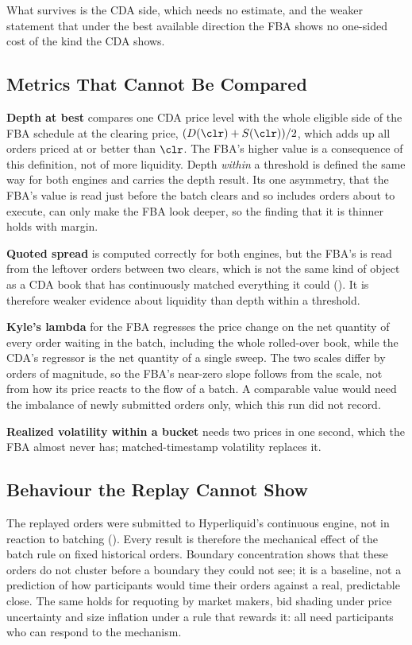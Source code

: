What survives is the CDA side, which needs no estimate, and the weaker
statement that under the best available direction the FBA shows no
one-sided cost of the kind the CDA shows.

\subsection{Metrics That Cannot Be Compared}
\label{sec:limitscomparable}

\textbf{Depth at best} compares one CDA price level with the whole
eligible side of the FBA schedule at the clearing price, $(D(\clr) +
S(\clr))/2$, which adds up all orders priced at or better than $\clr$. The
FBA's higher value is a consequence of this definition, not of more
liquidity. Depth \emph{within} a threshold is defined the same way for both
engines and carries the depth result. Its one asymmetry, that the FBA's
value is read just before the batch clears and so includes orders about to
execute, can only make the FBA look deeper, so the finding that it is
thinner holds with margin.

\textbf{Quoted spread} is computed correctly for both engines, but the
FBA's is read from the leftover orders between two clears, which is not
the same kind of object as a CDA book that has continuously matched
everything it could (). It is therefore weaker
evidence about liquidity than depth within a threshold.

\textbf{Kyle's lambda} for the FBA regresses the price change on the net
quantity of every order waiting in the batch, including the whole
rolled-over book, while the CDA's regressor is the net quantity of a single
sweep. The two scales differ by orders of magnitude, so the FBA's
near-zero slope follows from the scale, not from how its price reacts to
the flow of a batch. A comparable value would need the imbalance of newly
submitted orders only, which this run did not record.

\textbf{Realized volatility within a bucket} needs two prices in one
second, which the FBA almost never has; matched-timestamp volatility
replaces it.

\subsection{Behaviour the Replay Cannot Show}
\label{sec:limitsbehaviour}

The replayed orders were submitted to Hyperliquid's continuous engine, not
in reaction to batching (). Every result is therefore
the mechanical effect of the batch rule on fixed historical orders.
Boundary concentration shows that these orders do not cluster before a
boundary they could not see; it is a baseline, not a prediction of how
participants would time their orders against a real, predictable close.
The same holds for requoting by market makers, bid shading under price
uncertainty and size inflation under a rule that rewards it: all need
participants who can respond to the mechanism.

